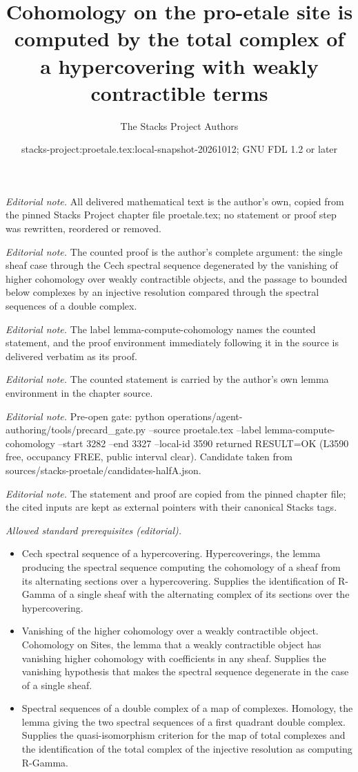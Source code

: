 \documentclass[10pt,a4paper]{amsart}
\title{Cohomology on the pro-etale site is computed by the total complex of a hypercovering with weakly contractible terms}
\author{The Stacks Project Authors}
\date{stacks-project:proetale.tex:local-snapshot-20261012; GNU FDL 1.2 or later}
\theoremstyle{plain}
\theoremstyle{definition}
\theoremstyle{remark}
\numberwithin{equation}{subsection}
\begin{document}
\maketitle
\noindent\textit{Editorial note.} All delivered mathematical text is the author's own, copied from the pinned Stacks Project chapter file proetale.tex; no statement or proof step was rewritten, reordered or removed.\par\medskip
\noindent\textit{Editorial note.} The counted proof is the author's complete argument: the single sheaf case through the Cech spectral sequence degenerated by the vanishing of higher cohomology over weakly contractible objects, and the passage to bounded below complexes by an injective resolution compared through the spectral sequences of a double complex.\par\medskip
\noindent\textit{Editorial note.} The label lemma-compute-cohomology names the counted statement, and the proof environment immediately following it in the source is delivered verbatim as its proof.\par\medskip
\noindent\textit{Editorial note.} The counted statement is carried by the author's own lemma environment in the chapter source.\par\medskip
\noindent\textit{Editorial note.} Pre-open gate: python operations/agent-authoring/tools/precard\_gate.py --source proetale.tex --label lemma-compute-cohomology --start 3282 --end 3327 --local-id 3590 returned RESULT=OK (L3590 free, occupancy FREE, public interval clear). Candidate taken from sources/stacks-proetale/candidates-halfA.json.\par\medskip
\noindent\textit{Editorial note.} The statement and proof are copied from the pinned chapter file; the cited inputs are kept as external pointers with their canonical Stacks tags.\par\medskip
\noindent\textit{Allowed standard prerequisites (editorial).}\begin{itemize}
\item Cech spectral sequence of a hypercovering. Hypercoverings, the lemma producing the spectral sequence computing the cohomology of a sheaf from its alternating sections over a hypercovering. Supplies the identification of R-Gamma of a single sheaf with the alternating complex of its sections over the hypercovering.
\item Vanishing of the higher cohomology over a weakly contractible object. Cohomology on Sites, the lemma that a weakly contractible object has vanishing higher cohomology with coefficients in any sheaf. Supplies the vanishing hypothesis that makes the spectral sequence degenerate in the case of a single sheaf.
\item Spectral sequences of a double complex of a map of complexes. Homology, the lemma giving the two spectral sequences of a first quadrant double complex. Supplies the quasi-isomorphism criterion for the map of total complexes and the identification of the total complex of the injective resolution as computing R-Gamma.
\end{itemize}\medskip
\end{document}
